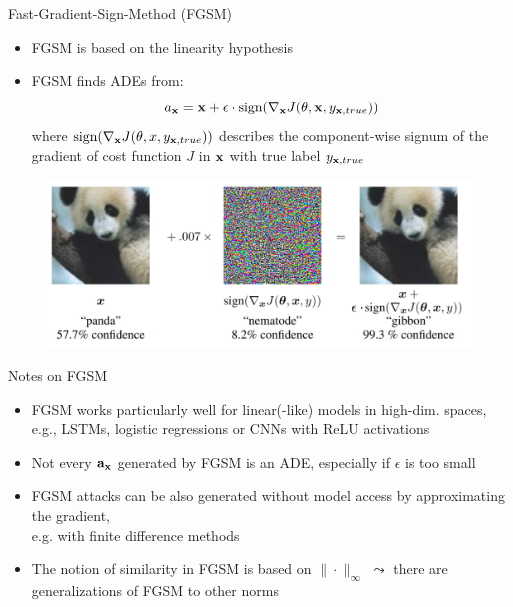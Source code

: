 \documentclass[10pt,compress,t,notes=noshow, xcolor=table]{beamer}
\begin{document}
\begin{frame}[c]{Fast-Gradient-Sign-Method (FGSM)
}
\begin{itemize}
    \item FGSM is based on the linearity hypothesis
    \item FGSM finds ADEs from:
    \begin{equation*}
        a_{\mathbf{x}}=\mathbf{x}+\epsilon\cdot\text{sign}(\nabla_{\mathbf{x}} J(\theta,\mathbf{x},y_{\mathbf{x},true}))
    \end{equation*}
    where $\text{sign}(\nabla_{\mathbf{x}} J(\theta,x,y_{\mathbf{x},true}))$ describes the component-wise signum of the gradient of cost function $J$ in $\mathbf{x}$ with true label $y_{\mathbf{x},true}$
\end{itemize}
\begin{figure}[h]
\centering
\includegraphics[width=0.7\linewidth]{figure/AEpanda.png}
  \label{fig:mnist}
\end{figure} 

\end{frame}

\begin{frame}[c]{Notes on FGSM  }
\begin{itemize}
    \item FGSM works particularly well for linear(-like) models in high-dim. spaces,\\ e.g., LSTMs, logistic regressions or CNNs with ReLU activations
    \item Not every $\mathbf{a}_{\mathbf{x}}$ generated by FGSM is an ADE, especially if $\epsilon$ is too small
    \item FGSM attacks can be also generated without model access by approximating the gradient,\\ e.g. with finite difference methods
    \item The notion of similarity in FGSM is based on $\|\cdot\|_{\infty}$ $\leadsto$ there are generalizations of FGSM to other norms
\end{itemize}
\end{frame}
\end{document}
